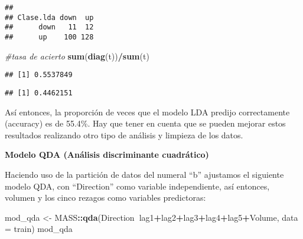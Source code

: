 \documentclass[
]{article}
\newenvironment{Shaded}{\begin{snugshade}}{\end{snugshade}}
\newcommand{\CommentTok}[1]{\textcolor[rgb]{0.56,0.35,0.01}{\textit{#1}}}
\newcommand{\DataTypeTok}[1]{\textcolor[rgb]{0.13,0.29,0.53}{#1}}
\newcommand{\KeywordTok}[1]{\textcolor[rgb]{0.13,0.29,0.53}{\textbf{#1}}}
\newcommand{\NormalTok}[1]{#1}
\newcommand{\OperatorTok}[1]{\textcolor[rgb]{0.81,0.36,0.00}{\textbf{#1}}}
\newcommand{\StringTok}[1]{\textcolor[rgb]{0.31,0.60,0.02}{#1}}
\begin{document}
\begin{verbatim}
##          
## Clase.lda down  up
##      down   11  12
##      up    100 128
\end{verbatim}

\begin{Shaded}
\begin{Highlighting}[]
\CommentTok{#tasa de acierto}
\KeywordTok{sum}\NormalTok{(}\KeywordTok{diag}\NormalTok{(t))}\OperatorTok{/}\KeywordTok{sum}\NormalTok{(t)}
\end{Highlighting}
\end{Shaded}

\begin{verbatim}
## [1] 0.5537849
\end{verbatim}

\begin{Shaded}
\end{Shaded}

\begin{verbatim}
## [1] 0.4462151
\end{verbatim}

Así entonces, la proporción de veces que el modelo LDA predijo
correctamente (accuracy) es de 55.4\%. Hay que tener en cuenta que se
pueden mejorar estos resultados realizando otro tipo de análisis y
limpieza de los datos.

\textbf{Modelo QDA (Análisis discriminante cuadrático)}

Haciendo uso de la partición de datos del numeral ``b'' ajustamos el
siguiente modelo QDA, con ``Direction'' como variable independiente, así
entonces, volumen y los cinco rezagos como variables predictoras:

\begin{Shaded}
\begin{Highlighting}[]
\NormalTok{mod_qda <-}\StringTok{ }\NormalTok{MASS}\OperatorTok{::}\KeywordTok{qda}\NormalTok{(Direction}\OperatorTok{~}\NormalTok{lag1}\OperatorTok{+}\NormalTok{lag2}\OperatorTok{+}\NormalTok{lag3}\OperatorTok{+}\NormalTok{lag4}\OperatorTok{+}\NormalTok{lag5}\OperatorTok{+}\NormalTok{Volume, }\DataTypeTok{data =}\NormalTok{ train)}
\NormalTok{mod_qda}
\end{Highlighting}
\end{Shaded}
\end{document}

